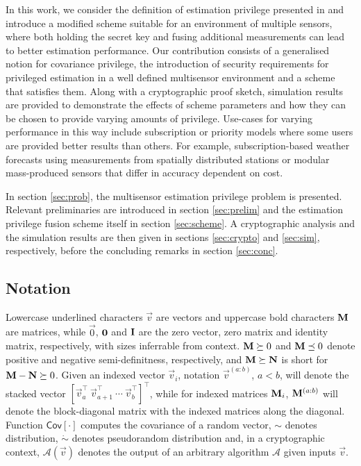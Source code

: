 \documentclass[letterpaper, 10 pt, conference]{ieeeconf}
\begin{document}
In this work, we consider the definition of estimation privilege presented in \cite{risticCryptographicallyPrivilegedState2022} and introduce a modified scheme suitable for an environment of multiple sensors, where both holding the secret key and fusing additional measurements can lead to better estimation performance. Our contribution consists of a generalised notion for covariance privilege, the introduction of security requirements for privileged estimation in a well defined multisensor environment and a scheme that satisfies them. Along with a cryptographic proof sketch, simulation results are provided to demonstrate the effects of scheme parameters and how they can be chosen to provide varying amounts of privilege. Use-cases for varying performance in this way include subscription or priority models where some users are provided better results than others. For example, subscription-based weather forecasts using measurements from spatially distributed stations or modular mass-produced sensors that differ in accuracy dependent on cost.

In section \ref{sec:prob}, the multisensor estimation privilege problem is presented. Relevant preliminaries are introduced in section \ref{sec:prelim} and the estimation privilege fusion scheme itself in section \ref{sec:scheme}. A cryptographic analysis and the simulation results are then given in sections \ref{sec:crypto} and \ref{sec:sim}, respectively, before the concluding remarks in section \ref{sec:conc}.

% 
% 

\subsection{Notation}\label{subsec:notation}
Lowercase underlined characters $\vec{v}$ are vectors and uppercase bold characters ${{\mathbf{M}}}$ are matrices, while $\vec{0}$, ${{\mathbf{0}}}$ and ${{\mathbf{I}}}$ are the zero vector, zero matrix and identity matrix, respectively, with sizes inferrable from context. ${{\mathbf{M}}}\succeq 0$ and ${{\mathbf{M}}}\preceq 0$ denote positive and negative semi-definitness, respectively, and ${{\mathbf{M}}}\succeq {\ensuremath{{\mathbf{N}}}}$ is short for ${{\mathbf{M}}} - {{\mathbf{N}}} \succeq 0$. Given an indexed vector $\vec{v}_i$, notation $\vec{v}^{(a:b)}$, $a<b$, will denote the stacked vector $[\vec{v}_a^\top\ \vec{v}_{a+1}^\top\ \cdots\ \vec{v}_b^\top]^\top$, while for indexed matrices ${{\mathbf{M}}}_i$, ${{\mathbf{M}}}^{(a:b)}$ will denote the block-diagonal matrix with the indexed matrices along the diagonal. Function $\mathsf{Cov}[\cdot]$ computes the covariance of a random vector, $\sim$ denotes distribution, $\dot{\sim}$ denotes pseudorandom distribution and, in a cryptographic context, $\mathcal{A}(\vec{v})$ denotes the output of an arbitrary algorithm $\mathcal{A}$ given inputs $\vec{v}$.
\end{document}
